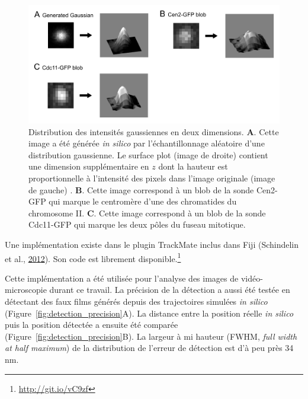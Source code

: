 \documentclass[12pt,a4paper,twoside,openright]{book}
\begin{document}
\begin{figure}[htbp]
\centering
\includegraphics{figures/results/imaging/gaussian.png}
\caption{\label{fig:gaussian}Distribution des intensités gaussiennes en
deux dimensions. \textbf{A}. Cette image a été générée \emph{in silico}
par l'échantillonnage aléatoire d'une distribution gaussienne. Le
surface plot (image de droite) contient une dimension supplémentaire en
\(z\) dont la hauteur est proportionnelle à l'intensité des pixels dans
l'image originale (image de gauche) . \textbf{B}. Cette image correspond
à un blob de la sonde Cen2-GFP qui marque le centromère d'une des
chromatides du chromosome II. \textbf{C}. Cette image correspond à un
blob de la sonde Cdc11-GFP qui marque les deux pôles du fuseau
mitotique.}
\end{figure}

Une implémentation existe dans le plugin TrackMate inclus dans Fiji
(Schindelin et al., \protect\hyperlink{ref-Schindelin2012}{2012}). Son
code est librement disponible.\footnote{\url{http://git.io/vC9zf}}

Cette implémentation a été utilisée pour l'analyse des images de
vidéo-microscopie durant ce travail. La précision de la détection a
aussi été testée en détectant des faux films générés depuis des
trajectoires simulées \emph{in silico}
(Figure~\ref{fig:detection_precision}A). La distance entre la position
réelle \emph{in silico} puis la position détectée a ensuite été comparée
(Figure~\ref{fig:detection_precision}B). La largeur à mi hauteur (FWHM,
\emph{full width at half maximum}) de la distribution de l'erreur de
détection est d'à peu près 34 nm.
\end{document}
